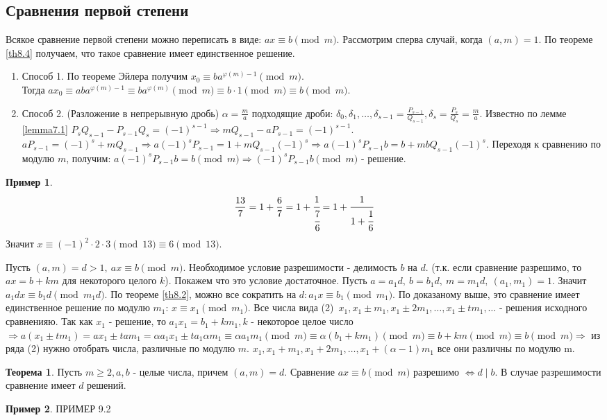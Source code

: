 \documentclass[a4paper, 12pt]{article}
\renewcommand{\phi}{\varphi}
\renewcommand{\div}{\mid}
\theoremstyle{definition}
\newtheorem{theorem}{Теорема}[section]
\newtheorem*{example}{Пример}
\begin{document}
    \subsection{Сравнения первой степени}
    Всякое сравнение первой степени можно переписать в виде: $ax\equiv b\pmod{m}$. Рассмотрим сперва случай, когда $(a,m)=1$. По теореме \ref{th8.4} получаем, что такое сравнение имеет единственное решение.
    \begin{enumerate}
        \item Способ 1. По теореме Эйлера получим $x_0\equiv ba^{\phi(m)-1}\pmod{m}$.\\
        Тогда $ax_0\equiv aba^{\phi(m)-1}\equiv ba^{\phi(m)}\pmod{m}\equiv b\cdot 1 \pmod{m}\equiv b\pmod{m}$.
        \item Способ 2. (Разложение в непрерывную дробь)
        $\alpha=\frac{m}{a}$ подходящие дроби: $\delta_0,\delta_1,\dots,\delta_{s-1}=\frac{P_{s-1}}{Q_{s-1}}, \delta_s=\frac{P_s}{Q_s}=\frac{m}{a}$. Известно по лемме \ref{lemma7.1} $P_s Q_{s-1}-P_{s-1}Q_s=(-1)^{s-1}\Rightarrow mQ_{s-1}-aP_{s-1}=(-1)^{s-1}$. $aP_{s-1}=(-1)^s+mQ_{s-1}\Rightarrow a(-1)^s P_{s-1}=1+mQ_{s-1}(-1)^s\Rightarrow a(-1)^sP_{s-1}b=b+mbQ_{s-1}(-1)^s$. Переходя к сравнению по модулю $m$, получим: $a(-1)^s P_{s-1}b=b \pmod{m}\Rightarrow (-1)^sP_{s-1}b\pmod{m}$ - решение.
    \end{enumerate}
    \begin{example}
        \[\frac{13}{7}=1+\frac{6}{7}=1+\cfrac{1}{\cfrac{7}{6}}=1+\cfrac{1}{1+\cfrac{1}{6}}\]
        Значит $x\equiv (-1)^2\cdot 2\cdot 3 \pmod{13}\equiv 6\pmod{13}$.
    \end{example}
    Пусть $(a,m)=d>1,\ ax\equiv b\pmod{m}$. Необходимое условие разрешимости - делимость $b$ на $d$.
    (т.к. если сравнение разрешимо, то $ax=b+km$ для некоторого целого $k$). Покажем что это условие достаточное. Пусть $a=a_1d,\ b=b_1d,\ m=m_1d,\ (a_1,m_1)=1$. Значит $a_1dx\equiv b_1d\pmod{m_1d}$. По теореме \ref{th8.2}, можно все сократить на $d: a_1x\equiv b_1\pmod{m_1}$. По доказаному выше, это сравнение имеет единственное решение по модулю $m_1$: $x\equiv x_1\pmod{m_1}$. Все числа вида (2)\ $x_1, x_1\pm m_1, x_1\pm 2m_1, \dots, x_1\pm tm_1,\dots$ - решения исходного сравненияю. Так как $x_1$ - решение, то $a_1x_1=b_1+km_1, k$ - некоторое целое число $\Rightarrow a(x_1\pm tm_1)=ax_1\pm tam_1=\alpha a_1 x_1 \pm t a_1 \alpha m_1 \equiv \alpha a_1 m_1 \pmod{m}\equiv \alpha(b_1+km_1)\pmod{m}\equiv b+km \pmod{m}\equiv b\pmod{m} \Rightarrow$ из ряда (2) нужно отобрать числа, различные по модулю $m$. $x_1,x_1+m_1,x_1+2m_1,\dots,x_1+(\alpha-1)m_1$ все они различны по модулю m.
    \begin{theorem}\label{th9.1}
        Пусть $m\geq 2, a,b$ - целые числа, причем $(a,m)=d$. Сравнение $ax\equiv b \pmod{m}$ разрешимо $\Leftrightarrow d\div b$. В случае разрешимости сравнение имеет $d$ решений.
    \end{theorem} 
    \begin{example}
        ПРИМЕР 9.2    
    \end{example}
\end{document}
